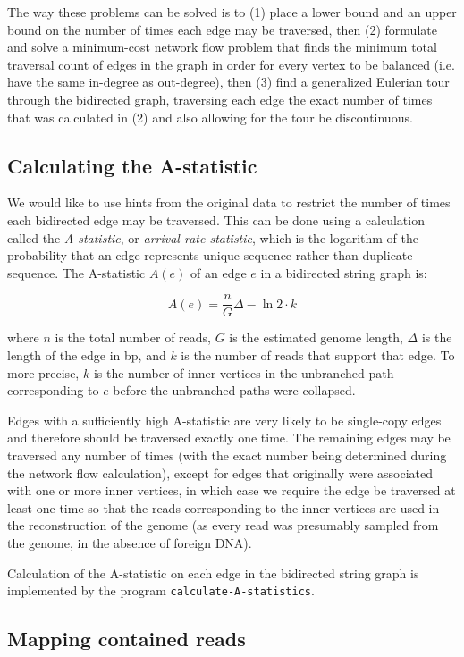 \documentclass[12pt]{article}
\newcommand{\KeyTerm}[1]{{\it #1}}
\begin{document}
The way these problems can be solved is to (1) place a lower bound and an upper
bound on the number of times each edge may be traversed, then (2) formulate and
solve a minimum-cost network flow problem that finds the minimum total traversal
count of edges in the graph in order for every vertex to be balanced (i.e. have
the same in-degree as out-degree), then (3) find a generalized Eulerian tour
through the bidirected graph, traversing each edge the exact number of times
that was calculated in (2) and also allowing for the tour be discontinuous.

\subsection{Calculating the A-statistic}

We would like to use hints from the original data to restrict the number of
times each bidirected edge may be traversed.  This can be done using a
calculation called the \KeyTerm{A-statistic}, or \KeyTerm{arrival-rate
statistic}, which is the logarithm of the probability that an edge represents
unique sequence rather than duplicate sequence\cite{Myers2005}.  The A-statistic
$A(e)$ of an edge $e$ in a bidirected string graph is:

\[ A(e) = \frac{n}{G} \Delta - \ln{2} \cdot {k} \]

where $n$ is the total number of reads, $G$ is the estimated genome length,
$\Delta$ is the length of the edge in bp, and $k$ is the number of reads that
support that edge.  To more precise, $k$ is the number of inner vertices in the
unbranched path corresponding to $e$ before the unbranched paths were collapsed.

Edges with a sufficiently high A-statistic are very likely to be single-copy
edges and therefore should be traversed exactly one time.  The remaining edges
may be traversed any number of times (with the exact number being determined
during the network flow calculation), except for edges that originally were
associated with one or more inner vertices, in which case we require the edge be
traversed at least one time so that the reads corresponding to the inner
vertices are used in the reconstruction of the genome (as every read was
presumably sampled from the genome, in the absence of foreign DNA).

Calculation of the A-statistic on each edge in the bidirected string graph is
implemented by the program {\tt calculate-A-statistics}.

\subsection{Mapping contained reads}
\end{document}

